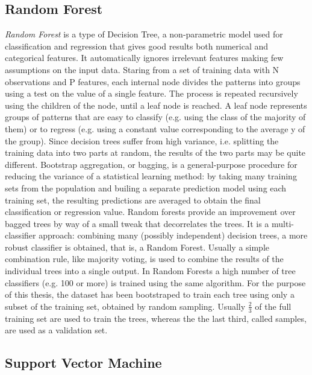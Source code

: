 \subsection{Random Forest}

\textit{Random Forest} is a type of Decision Tree, a non-parametric model used for classification and regression that gives good 
results both numerical and categorical features. It automatically ignores irrelevant features making few assumptions
on the input data. Staring from a set of training data with N observations and P features, each internal node divides the patterns into groups using a test on the value 
of a single feature. The process is repeated recursively using the children of the node, until a leaf node is reached. A leaf node represents groups of patterns that are easy to classify (e.g. using the class of the majority of 
them) or to regress (e.g. using a constant value corresponding to the average y of the group).
Since decision trees suffer from high variance, i.e. splitting the training data into two 
parts at random, the results of the two parts may be quite different. 
Bootstrap aggregation, or bagging, is a general-purpose procedure for reducing the 
variance of a statistical learning method: by taking many training sets from the population and builing a separate 
prediction model using each training set, the resulting predictions are averaged to obtain the final classification or regression value.
Random forests provide an improvement over bagged trees by way of a small tweak that 
decorrelates the trees. It is a multi-classifier approach: combining many (possibly independent) 
decision trees, a more robust classifier is obtained, that is, a Random Forest. Usually a simple combination rule, like majority voting, is used to combine the results of the individual trees into a single output.
In Random Forests a high number of tree classifiers (e.g. 100 or more) is trained using the same 
algorithm. 
For the purpose of this thesis, the dataset has been bootstraped to train each tree using only a subset of the training set, obtained by random sampling.
Usually $\frac{2}{3}$ of the full training set are used to train the trees, whereas the the last third, called  samples, are used as a validation set.


\subsection{Support Vector Machine}

